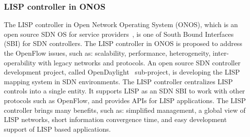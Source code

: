 \subsubsection{LISP controller in ONOS}
\label{subsubsec:implementation_onos}
The LISP controller in Open Network Operating System (ONOS), which is an open source SDN OS for service providers~\cite{han2016design}, is one of South Bound Interfaces (SBI) for SDN controllers. The LISP controller in ONOS is proposed to address the OpenFlow issues, such as: scalability, performance, heterogeneity, inter-operability with legacy networks and protocols. An open source SDN controller development project, called OpenDaylight~\cite{OpenDaylight} sub-project, is developing the LISP mapping system in SDN environments. The LISP controller centralizes LISP controls into a single entity. It supports LISP as an SDN SBI to work with other protocols such as OpenFlow, and provides APIs for LISP applications. %
The LISP controller brings many benefits, such as: simplified management, a global view of LISP networks, short information convergence time, and easy development support of LISP based applications. 

